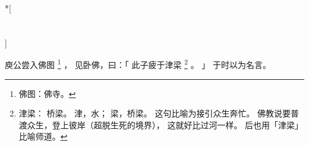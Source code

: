 
\switchcolumn[0]*[\section{}]

庾公尝入佛图%
\footnote{%
    佛图：佛寺。
}%
，
见卧佛，曰：「
    此子疲于津梁%
    \footnote{%
        津梁：
            桥梁。
            津，水；
            梁，桥梁。
            这句比喻为接引众生奔忙。
            佛教说要普渡众生，登上彼岸（超脱生死的境界），
            这就好比过河一样。
            后也用「津梁」比喻师道。
    }%
    。
」
于时以为名言。

\switchcolumn


